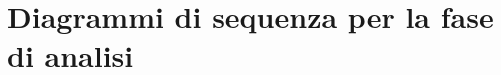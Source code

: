 \documentclass[../main.tex]{subfiles}
\begin{document}
\chapter{Diagrammi di sequenza per la fase di analisi}
\end{document}
